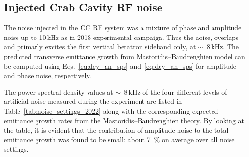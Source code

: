 \subsection{Injected Crab Cavity RF noise}\label{sec:injected_cc_noise_2022}
The noise injected in the ${\mathrm{CC}}$ RF system was a mixture of phase and amplitude noise up to 10\,kHz as in 2018 experimental campaign. Thus the noise, overlaps and primarly excites the first vertical betatron sideband only, at $\sim$~8\,kHz. The predicted transverse emittance growth from Mastoridis--Baudrenghien model can be computed using Eqs.~\eqref{eq:dey_an_sps} and~\eqref{eq:dey_an_sps} for amplitude and phase noise, respectively.

The power spectral density values at $\sim$~8\,kHz of the four different levels of artificial noise measured during the experiment are listed in Table~\ref{tab:noise_settings_2022} along with the corresponding expected emittance growth rates from the Mastoridis--Baudrenghien theory. By looking at the table, it is evident that the contribution of amplitude noise to the total emittance growth was found to be small: about 7~$\%$ on average over all noise settings.







